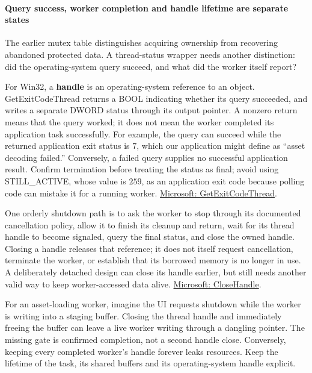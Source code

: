 \paragraph{Query success, worker completion and handle lifetime are separate states}\label{05-engine-i-ch013-query-success-worker-completion-and-handle-lifetime-are-separate-states}

The earlier mutex table distinguishes acquiring ownership from recovering abandoned protected data. A thread-status wrapper needs another distinction: did the operating-system query succeed, and what did the worker itself report?

For Win32, a \textbf{handle} is an operating-system reference to an object. GetExitCodeThread returns a BOOL indicating whether its query succeeded, and writes a separate DWORD status through its output pointer. A nonzero return means that the query worked; it does not mean the worker completed its application task successfully. For example, the query can succeed while the returned application exit status is \(7\), which our application might define as ``asset decoding failed.'' Conversely, a failed query supplies no successful application result. Confirm termination before treating the status as final; avoid using STILL\_ACTIVE, whose value is \(259\), as an application exit code because polling code can mistake it for a running worker. \href{https://learn.microsoft.com/en-us/windows/win32/api/processthreadsapi/nf-processthreadsapi-getexitcodethread}{Microsoft: GetExitCodeThread}.

One orderly shutdown path is to ask the worker to stop through its documented cancellation policy, allow it to finish its cleanup and return, wait for its thread handle to become signaled, query the final status, and close the owned handle. Closing a handle releases that reference; it does not itself request cancellation, terminate the worker, or establish that its borrowed memory is no longer in use. A deliberately detached design can close its handle earlier, but still needs another valid way to keep worker-accessed data alive. \href{https://learn.microsoft.com/en-us/windows/win32/api/handleapi/nf-handleapi-closehandle}{Microsoft: CloseHandle}.

For an asset-loading worker, imagine the UI requests shutdown while the worker is writing into a staging buffer. Closing the thread handle and immediately freeing the buffer can leave a live worker writing through a dangling pointer. The missing gate is confirmed completion, not a second handle close. Conversely, keeping every completed worker's handle forever leaks resources. Keep the lifetime of the task, its shared buffers and its operating-system handle explicit.

